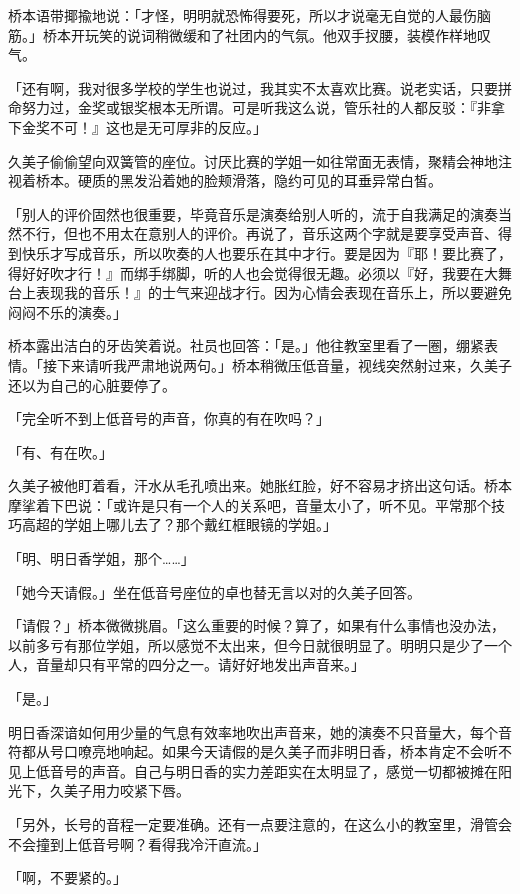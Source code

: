 \documentclass[UTF8]{ctexart}
\begin{document}
    桥本语带揶揄地说：「才怪，明明就恐怖得要死，所以才说毫无自觉的人最伤脑筋。」桥本开玩笑的说词稍微缓和了社团内的气氛。他双手扠腰，装模作样地叹气。 

    「还有啊，我对很多学校的学生也说过，我其实不太喜欢比赛。说老实话，只要拼命努力过，金奖或银奖根本无所谓。可是听我这么说，管乐社的人都反驳：『非拿下金奖不可！』这也是无可厚非的反应。」 

    久美子偷偷望向双簧管的座位。讨厌比赛的学姐一如往常面无表情，聚精会神地注视着桥本。硬质的黑发沿着她的脸颊滑落，隐约可见的耳垂异常白皙。 

    「别人的评价固然也很重要，毕竟音乐是演奏给别人听的，流于自我满足的演奏当然不行，但也不用太在意别人的评价。再说了，音乐这两个字就是要享受声音、得到快乐才写成音乐，所以吹奏的人也要乐在其中才行。要是因为『耶！要比赛了，得好好吹才行！』而绑手绑脚，听的人也会觉得很无趣。必须以『好，我要在大舞台上表现我的音乐！』的士气来迎战才行。因为心情会表现在音乐上，所以要避免闷闷不乐的演奏。」 

    桥本露出洁白的牙齿笑着说。社员也回答：「是。」他往教室里看了一圈，绷紧表情。「接下来请听我严肃地说两句。」桥本稍微压低音量，视线突然射过来，久美子还以为自己的心脏要停了。 

    「完全听不到上低音号的声音，你真的有在吹吗？」 

    「有、有在吹。」 

    久美子被他盯着看，汗水从毛孔喷出来。她胀红脸，好不容易才挤出这句话。桥本摩挲着下巴说：「或许是只有一个人的关系吧，音量太小了，听不见。平常那个技巧高超的学姐上哪儿去了？那个戴红框眼镜的学姐。」 

    「明、明日香学姐，那个……」 

    「她今天请假。」坐在低音号座位的卓也替无言以对的久美子回答。 

    「请假？」桥本微微挑眉。「这么重要的时候？算了，如果有什么事情也没办法，以前多亏有那位学姐，所以感觉不太出来，但今日就很明显了。明明只是少了一个人，音量却只有平常的四分之一。请好好地发出声音来。」 

    「是。」 

    明日香深谙如何用少量的气息有效率地吹出声音来，她的演奏不只音量大，每个音符都从号口嘹亮地响起。如果今天请假的是久美子而非明日香，桥本肯定不会听不见上低音号的声音。自己与明日香的实力差距实在太明显了，感觉一切都被摊在阳光下，久美子用力咬紧下唇。 

    「另外，长号的音程一定要准确。还有一点要注意的，在这么小的教室里，滑管会不会撞到上低音号啊？看得我冷汗直流。」 

    「啊，不要紧的。」 
\end{document}
